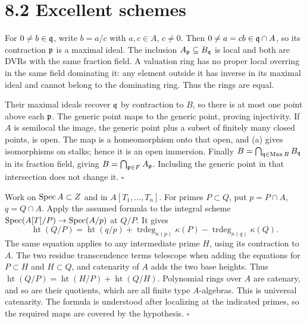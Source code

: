 \documentclass[11pt]{article}
\let\chapterexercise\exercise
\renewcommand{\exercise}[2]{\Needspace{8\baselineskip}\chapterexercise{#1}{#2}}
\begin{document}
\section*{8.2 Excellent schemes}

\pf
For $0\ne b\in\mathfrak q$, write $b=a/c$ with $a,c\in A$, $c\ne0$. Then $0\ne a=cb\in\mathfrak q\cap A$, so its contraction $\mathfrak p$ is a maximal ideal. The inclusion $A_\mathfrak p\subseteq B_\mathfrak q$ is local and both are DVRs with the same fraction field. A valuation ring has no proper local overring in the same field dominating it: any element outside it has inverse in its maximal ideal and cannot belong to the dominating ring. Thus the rings are equal.

Their maximal ideals recover $\mathfrak q$ by contraction to $B$, so there is at most one point above each $\mathfrak p$. The generic point maps to the generic point, proving injectivity. If $A$ is semilocal the image, the generic point plus a subset of finitely many closed points, is open. The map is a homeomorphism onto that open, and (a) gives isomorphisms on stalks; hence it is an open immersion. Finally $B=\bigcap_{\mathfrak q\in\operatorname{Max}B}B_\mathfrak q$ in its fraction field, giving $B=\bigcap_{\mathfrak p\in F}A_\mathfrak p$. Including the generic point in that intersection does not change it. \hfill$\square$

\pf
Work on $\operatorname{Spec} A\subset Z$ and in $A[T_1,\ldots,T_n]$. For primes $P\subset Q$, put $p=P\cap A$, $q=Q\cap A$. Apply the assumed formula to the integral scheme $\operatorname{Spec}(A[T]/P)\to\operatorname{Spec}(A/p)$ at $Q/P$. It gives
\[ \operatorname{ht}(Q/P)=\operatorname{ht}(q/p)
 +\operatorname{trdeg}_{\kappa(p)}\kappa(P)
 -\operatorname{trdeg}_{\kappa(q)}\kappa(Q). \]
The same equation applies to any intermediate prime $H$, using its contraction to $A$. The two residue transcendence terms telescope when adding the equations for $P\subset H$ and $H\subset Q$, and catenarity of $A$ adds the two base heights. Thus $\operatorname{ht}(Q/P)=\operatorname{ht}(H/P)+\operatorname{ht}(Q/H)$. Polynomial rings over $A$ are catenary, and so are their quotients, which are all finite type $A$-algebras. This is universal catenarity. The formula is understood after localizing at the indicated primes, so the required maps are covered by the hypothesis. \hfill$\square$
\end{document}
